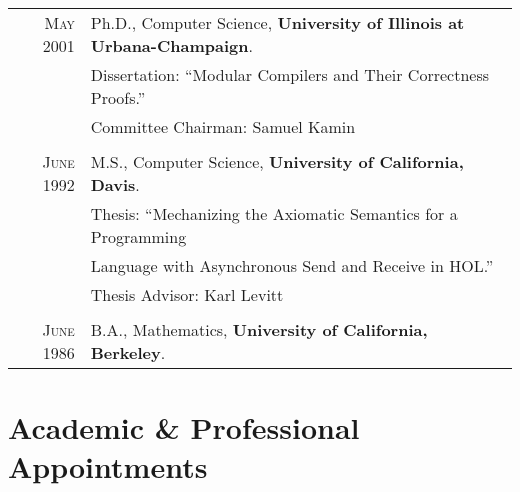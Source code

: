 \documentclass[11pt]{article}
\begin{document}
\begin{tabular}{rl}	
\textsc{May 2001} & 
Ph.D., Computer Science, \textbf{University of Illinois at Urbana-Champaign}.
\\
	&    Dissertation: ``Modular Compilers and Their Correctness Proofs.''
  \\
  & Committee Chairman:  Samuel Kamin

\\
\\
\textsc{June 1992}
    & M.S., Computer Science, \textbf{University of California, Davis}.
    \\ 
    & Thesis: ``Mechanizing the Axiomatic Semantics for a Programming 
    \\& \hspace{9ex} Language with Asynchronous Send and Receive in HOL.''
    \\
    & Thesis Advisor: Karl Levitt
%
\\
\\
%
\textsc{June 1986} &     B.A., Mathematics,   \textbf{University of California, Berkeley}.
\end{tabular}

\section{Academic  \& Professional Appointments }
\end{document}
